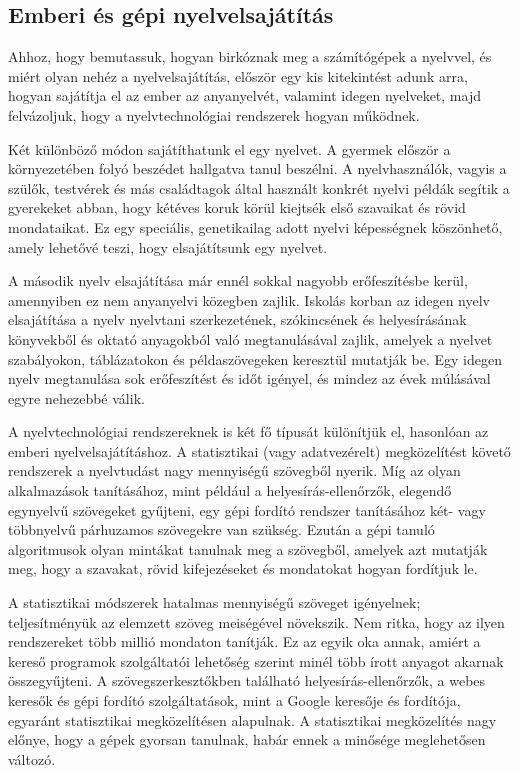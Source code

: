 \begin{multicols}{2}
  \subsection{Emberi és gépi nyelvelsajátítás}

  Ahhoz, hogy bemutassuk, hogyan birkóznak meg a számítógépek a nyelvvel, és miért olyan nehéz a nyelvelsajátítás, elő\-ször egy kis kitekintést adunk arra, hogyan sajátítja el az ember az anyanyelvét, valamint idegen nyelveket, majd felvázoljuk, hogy a nyelvtechnológiai rend\-sze\-rek hogyan működnek. 


  Két különböző módon sajátíthatunk el egy nyelvet. A gyermek először a kör\-nye\-ze\-té\-ben folyó beszédet hallgatva tanul beszélni. A nyelvhasználók, vagyis a szülők, testvérek és más családtagok által használt konkrét nyelvi példák segítik a gyerekeket abban, hogy kétéves koruk körül kiejtsék első szavaikat és rövid mondataikat. Ez egy speciális, genetikailag adott nyelvi képességnek köszönhető, a\-mely lehetővé teszi, hogy elsajátítsunk egy nyelvet. 

  A második nyelv elsajátítása már ennél sokkal nagyobb erőfeszítésbe kerül, a\-mennyi\-ben ez nem anyanyelvi közegben zajlik. Iskolás korban az idegen nyelv elsajátítása a nyelv nyelvtani szerkezetének, szókincsének és helyesírásának könyvekből és oktató anyagokból való megtanulásával zajlik, amelyek a nyelvet szabályokon, táblázatokon és példaszövegeken keresztül mutatják be. Egy idegen nyelv meg\-ta\-nu\-lá\-sa sok erőfeszítést és időt igényel, és mindez  az évek múlásával egyre nehezebbé válik.  

  A nyelvtechnológiai rendszereknek is két fő típusát különítjük el, hasonlóan az emberi nyelvelsajátításhoz. A statisztikai (vagy adatvezérelt) megközelítést követő rendszerek a nyelvtudást nagy mennyi\-sé\-gű  szövegből nyerik. Míg az olyan alkalmazások tanításához, mint például a helyesírás-ellenőrzők, elegendő egynyelvű szövegeket gyűjteni, egy gépi fordító rendszer tanításához két- vagy többnyelvű párhuzamos szövegekre van szükség. Ez\-után a gépi tanuló algoritmusok olyan mintákat tanulnak meg a szövegből, amelyek azt mutatják meg, hogy a szavakat, rövid kifejezéseket és mondatokat hogyan fordítjuk le.  

  A statisztikai módszerek hatalmas mennyi\-sé\-gű szöveget igényelnek; teljesítményük az elemzett szöveg meiségével növekszik. Nem ritka, hogy az ilyen rendszereket több millió mondaton tanítják. Ez az egyik oka annak, amiért a kereső programok szolgáltatói lehetőség szerint minél több írott anyagot akarnak össze\-gyűj\-te\-ni. A szövegszerkesztőkben található helyesírás-ellenőrzők, a webes keresők és gépi fordító szolgáltatások, mint a Google keresője és fordítója, egyaránt statisztikai megközelítésen alapulnak. A statisztikai megközelítés nagy előnye, hogy a gépek gyorsan tanulnak, habár ennek a minősége meglehetősen változó.


\end{multicols}
